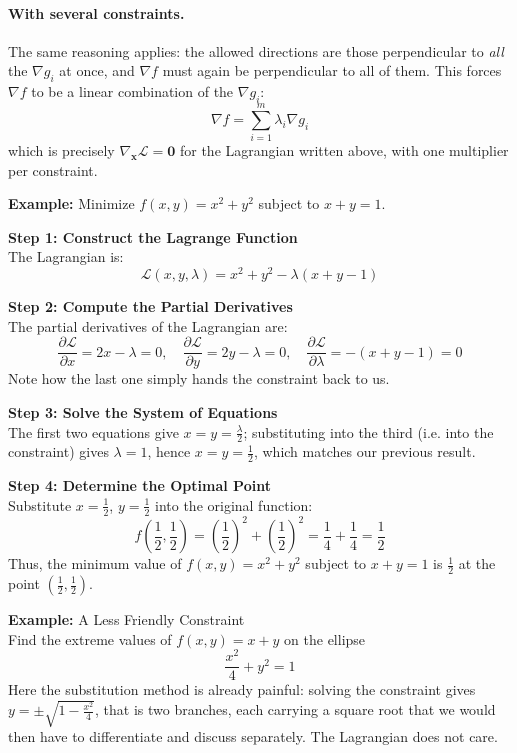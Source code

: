 \documentclass[]{article}
\begin{document}
	\paragraph{With several constraints.}
	The same reasoning applies: the allowed directions are those perpendicular to \textit{all} the $\nabla g_i$ at once, and $\nabla f$ must again be perpendicular to all of them.
	This forces $\nabla f$ to be a linear combination of the $\nabla g_i$:
	$$
	\nabla f = \sum_{i=1}^m \lambda_i \nabla g_i
	$$
	which is precisely $\nabla_\mathbf{x} \mathcal{L} = \mathbf{0}$ for the Lagrangian written above, with one multiplier per constraint.

	\vspace{1cm}
	\textbf{Example:}
	Minimize $f(x, y) = x^2 + y^2$ subject to $x + y = 1$.

	\textbf{Step 1: Construct the Lagrange Function}\\
	The Lagrangian is:
	$$
	\mathcal{L}(x, y, \lambda) = x^2 + y^2 - \lambda (x + y - 1)
	$$

	\textbf{Step 2: Compute the Partial Derivatives}\\
	The partial derivatives of the Lagrangian are:
	$$
	\frac{\partial \mathcal{L}}{\partial x} = 2x - \lambda = 0, \quad \frac{\partial \mathcal{L}}{\partial y} = 2y - \lambda = 0, \quad \frac{\partial \mathcal{L}}{\partial \lambda} = -(x + y - 1) = 0
	$$
	Note how the last one simply hands the constraint back to us.

	\textbf{Step 3: Solve the System of Equations}\\
	The first two equations give $x = y = \frac{\lambda}{2}$; substituting into the third (i.e. into the constraint) gives $\lambda = 1$, hence $x = y = \frac{1}{2}$, which matches our previous result.
	
	\textbf{Step 4: Determine the Optimal Point}\\
	Substitute $x = \frac{1}{2}$, $y = \frac{1}{2}$ into the original function:
	$$
	f\left(\frac{1}{2}, \frac{1}{2}\right) = \left(\frac{1}{2}\right)^2 + \left(\frac{1}{2}\right)^2 = \frac{1}{4} + \frac{1}{4} = \frac{1}{2}
	$$
	Thus, the minimum value of $f(x, y) = x^2 + y^2$ subject to $x + y = 1$ is $\frac{1}{2}$ at the point $\left(\frac{1}{2}, \frac{1}{2}\right)$.

	\vspace{1cm}
	\textbf{Example:}
	A Less Friendly Constraint\\
	Find the extreme values of $f(x, y) = x + y$ on the ellipse
	$$
	\frac{x^2}{4} + y^2 = 1
	$$
	Here the substitution method is already painful: solving the constraint gives $y = \pm\sqrt{1 - \frac{x^2}{4}}$, that is two branches, each carrying a square root that we would then have to differentiate and discuss separately.
	The Lagrangian does not care.
\end{document}

